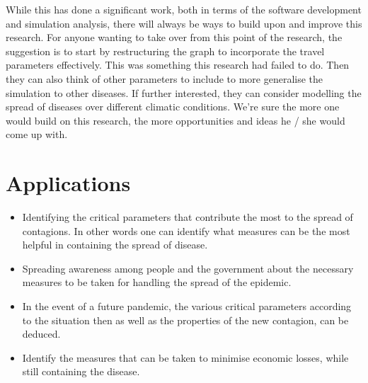 \documentclass[conference]{IEEEtran}
\begin{document}
        While this has done a significant work, both in terms of the software development and simulation analysis, there will always be ways to build upon and improve this research. For anyone wanting to take over from this point of the research, the suggestion is to start by restructuring the graph to incorporate the travel parameters effectively. This was something this research had failed to do. Then they can also think of other parameters to include to more generalise the simulation to other diseases. If further interested, they can consider modelling the spread of diseases over different climatic conditions. We're sure the more one would build on this research, the more opportunities and ideas he / she would come up with.
        
    \vspace{0.1in}
    \section{Applications}
        \begin{itemize}
            \item Identifying the critical parameters that contribute the most to the spread of contagions. In other words one can identify what measures can be the most helpful in containing the spread of disease.
            \item Spreading awareness among people and the government about the necessary measures to be taken for handling the spread of the epidemic.
            \item In the event of a future pandemic, the various critical parameters according to the situation then as well as the properties of the new contagion, can be deduced.
            \item Identify the measures that can be taken to minimise economic losses, while still containing the disease.
        \end{itemize}
\end{document}
